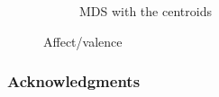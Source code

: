 \documentclass{article} %
\begin{document}
\begin{figure}[H]
\begin{subfigure}[t]{.5\textwidth}
       \caption{MDS with the centroids}
    \end{subfigure}
    \caption{Affect/valence}
    \label{affect-valence}
\end{figure}

\subsubsection*{Acknowledgments}



\end{document}
